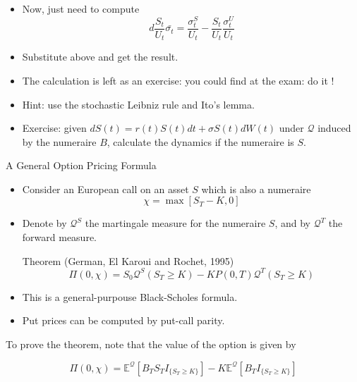 \documentclass{beamer}
\begin{document}
\begin{frame}
\begin{itemize}
	\item Now, just need to compute
	\begin{equation}
		d\frac{S_t}{U_t}\bar{\sigma_t}= \frac{\sigma^S_t}{U_t}-\frac{S_t}{U_t}\frac{\sigma_t^U}{U_t}
	\end{equation}
\item Substitute above and get the result.
\item The calculation is left as an exercise: you could find at the exam: do it !
\item Hint: use the stochastic Leibniz rule and Ito's lemma.
\item Exercise: given $dS(t)=r(t)S(t)dt + \sigma S(t)dW(t)$ under $\mathcal{Q}$ induced by the numeraire $B$, calculate the dynamics if the numeraire is $S$.
\end{itemize}
\end{frame}

\begin{frame}{A General Option Pricing Formula}
	\begin{itemize}
		\item Consider an European call on an asset $S$ which is also a numeraire
		\begin{equation}
			\chi = \max[S_T-K,0]
		\end{equation}
		\item Denote by $\mathcal{Q}^S$ the martingale measure for the numeraire $S$, and by $\mathcal{Q}^T$ the forward measure.
		\begin{block}{Theorem (German, El Karoui and Rochet, 1995)}
			\begin{equation}
				\Pi(0,\chi) = S_0\mathcal{Q}^S(S_T \geq K) - KP(0,T)\mathcal{Q}^T(S_T\geq K)
			\end{equation}
		\end{block}
		\item This is a general-purpouse Black-Scholes formula.
		\item Put prices can be computed by put-call parity.
	\end{itemize}
\end{frame}

\begin{frame}
To prove the theorem, note that the value of the option is given by

\begin{equation}
\Pi(0,\chi) = \mathbb{E}^{\mathcal{Q}}[B_TS_T I_{\{S_T\geq K\}}] - K\mathbb{E}^{\mathcal{Q}}[B_TI_{\{S_T\geq K\}}]
\end{equation}
\end{frame}
\end{document}
